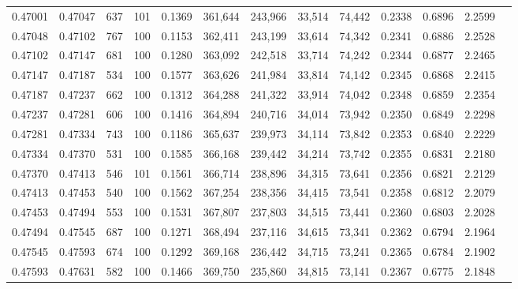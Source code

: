 \begin{tabular}{rrrrrrrrrrrrr}
0.47001 & 0.47047 &   637 & 101 &                                     0.1369 & 361,644 & 243,966 &  33,514 &  74,442 & 0.2338 & 0.6896 & 2.2599 \\
0.47048 & 0.47102 &   767 & 100 &                                     0.1153 & 362,411 & 243,199 &  33,614 &  74,342 & 0.2341 & 0.6886 & 2.2528 \\
0.47102 & 0.47147 &   681 & 100 &                                     0.1280 & 363,092 & 242,518 &  33,714 &  74,242 & 0.2344 & 0.6877 & 2.2465 \\
0.47147 & 0.47187 &   534 & 100 &                                     0.1577 & 363,626 & 241,984 &  33,814 &  74,142 & 0.2345 & 0.6868 & 2.2415 \\
0.47187 & 0.47237 &   662 & 100 &                                     0.1312 & 364,288 & 241,322 &  33,914 &  74,042 & 0.2348 & 0.6859 & 2.2354 \\
0.47237 & 0.47281 &   606 & 100 &                                     0.1416 & 364,894 & 240,716 &  34,014 &  73,942 & 0.2350 & 0.6849 & 2.2298 \\
0.47281 & 0.47334 &   743 & 100 &                                     0.1186 & 365,637 & 239,973 &  34,114 &  73,842 & 0.2353 & 0.6840 & 2.2229 \\
0.47334 & 0.47370 &   531 & 100 &                                     0.1585 & 366,168 & 239,442 &  34,214 &  73,742 & 0.2355 & 0.6831 & 2.2180 \\
0.47370 & 0.47413 &   546 & 101 &                                     0.1561 & 366,714 & 238,896 &  34,315 &  73,641 & 0.2356 & 0.6821 & 2.2129 \\
0.47413 & 0.47453 &   540 & 100 &                                     0.1562 & 367,254 & 238,356 &  34,415 &  73,541 & 0.2358 & 0.6812 & 2.2079 \\
0.47453 & 0.47494 &   553 & 100 &                                     0.1531 & 367,807 & 237,803 &  34,515 &  73,441 & 0.2360 & 0.6803 & 2.2028 \\
0.47494 & 0.47545 &   687 & 100 &                                     0.1271 & 368,494 & 237,116 &  34,615 &  73,341 & 0.2362 & 0.6794 & 2.1964 \\
0.47545 & 0.47593 &   674 & 100 &                                     0.1292 & 369,168 & 236,442 &  34,715 &  73,241 & 0.2365 & 0.6784 & 2.1902 \\
0.47593 & 0.47631 &   582 & 100 &                                     0.1466 & 369,750 & 235,860 &  34,815 &  73,141 & 0.2367 & 0.6775 & 2.1848 \\

\end{tabular}
